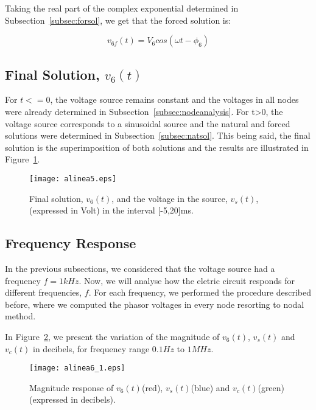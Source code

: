Taking the real part of the complex exponential determined in Subsection~\ref{subsec:forsol}, we get that the forced solution is:

\begin{equation}
  v_{6f}(t) = V_6 cos(\omega t - \phi_6)
\end{equation}


\subsection{Final Solution, $v_6(t)$} \label{subsec:finsol}

For $t<=0$, the voltage source remains constant and the voltages in all nodes were already determined in Subsection~\ref{subsec:nodeanalysis}. For t>0, the voltage source corresponds to a sinusoidal source and the natural and forced solutions were determined in Subsection~\ref{subsec:natsol}. This being said, the final solution is the superimposition of both solutions and the results are illustrated in Figure~\ref{fig:finsol}.

\begin{figure}[H] \centering
\texttt{[image: alinea5.eps]}
\caption{Final solution, $v_{6}(t)$, and the voltage in the source, $v_s(t)$, (expressed in Volt) in the interval [-5,20]ms.}
\label{fig:finsol}
\end{figure}


\subsection{Frequency Response}

In the previous subsections, we considered that the voltage source had a frequency $f=1kHz$. Now, we will analyse how the eletric circuit responds for different frequencies, $f$. For each frequency, we performed the procedure described before, where we computed the phasor voltages in every node resorting to nodal method.

In Figure~\ref{fig:magnitude}, we present the variation of the magnitude of $v_6(t)$, $v_s(t)$ and $v_c(t)$ in decibels, for frequency range $0.1Hz$ to $1MHz$.

\begin{figure}[H] \centering
\texttt{[image: alinea6\_1.eps]}
\caption{Magnitude response of $v_6(t)$(red), $v_s(t)$(blue) and $v_c(t)$(green) (expressed in decibels).}
\label{fig:magnitude}
\end{figure}

